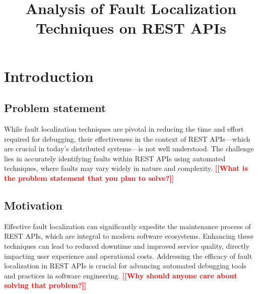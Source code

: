 \documentclass[conference]{IEEEtran}
\newcommand{\todo}[1]{\textcolor{red}{{\bfseries [[#1]]}}}
\begin{document}
\title{Analysis of Fault Localization Techniques on REST APIs}

\author{
\and
{}
}

\maketitle

\begin{abstract}
\end{abstract}

\begin{IEEEkeywords}

\end{IEEEkeywords}

\section{Introduction}
\label{sec:introduction}

\subsection{Problem statement}
    While fault localization techniques are pivotal in reducing the time and effort required for debugging, their effectiveness in the context of REST APIs—which are crucial in today's distributed systems—is not well understood. The challenge lies in accurately identifying faults within REST APIs using automated techniques, where faults may vary widely in nature and complexity.
    \todo{What is the problem statement that you plan to solve?}

\subsection{Motivation}
    Effective fault localization can significantly expedite the maintenance process of REST APIs, which are integral to modern software ecosystems. Enhancing these techniques can lead to reduced downtime and improved service quality, directly impacting user experience and operational costs. Addressing the efficacy of fault localization in REST APIs is crucial for advancing automated debugging tools and practices in software engineering.
    \todo{Why should anyone care about solving that problem?}
\end{document}
